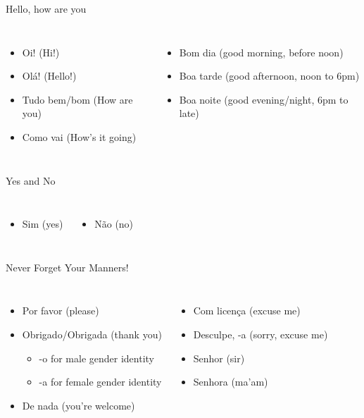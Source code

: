 \begin{frame}{Hello, how are you}
  \begin{columns}
    \begin{itemize}
    \item<1-> Oi! (Hi!)
    \item<2-> Ol\'a! (Hello!)
    \item<3-> Tudo bem/bom (How are you)
    \item<4-> Como vai (How's it going)
    \end{itemize}
    \begin{itemize}
    \item<5-> Bom dia (good morning, before noon)
    \item<6-> Boa tarde (good afternoon, noon to 6pm)
    \item<7-> Boa noite (good evening/night, 6pm to late)
    \end{itemize}
  \end{columns}  
\end{frame}

\begin{frame}{Yes and No}
  \begin{columns}
    \begin{itemize}
    \item Sim (yes)
    \end{itemize}
    \begin{itemize}
    \item N\~ao (no)
    \end{itemize}
  \end{columns}
\end{frame}

\begin{frame}{Never Forget Your Manners!}
  \begin{columns}
    \begin{itemize}
    \item<1-> Por favor (please)
    \item<2-> Obrigado/Obrigada (thank you)
      \begin{itemize}
      \item<2-> -o for male gender identity
      \item<2-> -a for female gender identity
      \end{itemize}
    \item<3-> De nada (you're welcome)
    \end{itemize}
    \begin{itemize}
    \item<4-> Com licen\c{c}a (excuse me)
    \item<5-> Desculpe, -a (sorry, excuse me)
    \item<6-> Senhor (sir)
    \item<7-> Senhora (ma'am)
    \end{itemize}
  \end{columns}
\end{frame}

